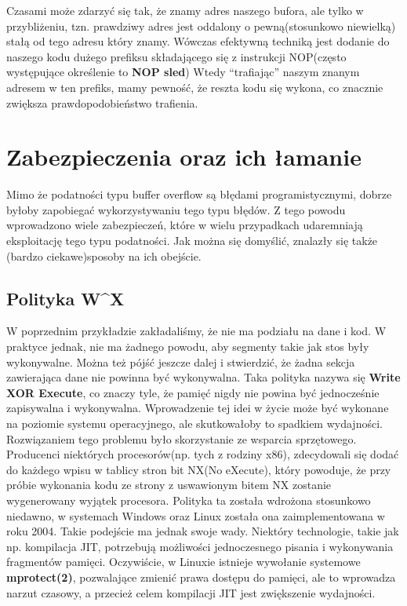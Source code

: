 \documentclass[polish]{kbk}
\begin{document}
Czasami może zdarzyć się tak, że znamy adres naszego bufora, ale tylko w przybliżeniu, tzn. 
prawdziwy adres jest oddalony o pewną(stosunkowo niewielką) stałą od tego adresu który znamy.
Wówczas efektywną techniką jest dodanie do naszego kodu dużego prefiksu składającego się z instrukcji NOP(często występujące określenie to \textbf{NOP sled}) Wtedy ``trafiając'' naszym znanym adresem w ten prefiks, mamy pewność, że reszta kodu się wykona, co znacznie zwiększa prawdopodobieństwo trafienia. 


\section{Zabezpieczenia oraz ich łamanie}
Mimo że podatności typu buffer overflow są błędami programistycznymi, dobrze byłoby zapobiegać 
wykorzystywaniu tego typu błędów.
Z tego powodu wprowadzono wiele zabezpieczeń, które w wielu przypadkach udaremniają eksploitację 
tego typu podatności. Jak można się domyślić, znalazły się także (bardzo ciekawe)sposoby na ich obejście.
\subsection{Polityka W\string^X}
W poprzednim przykładzie zakładaliśmy, że nie ma podziału na dane i kod. 
W praktyce jednak, nie ma żadnego powodu, aby segmenty takie jak stos były wykonywalne.
Można też pójść jeszcze dalej i stwierdzić, że żadna sekcja zawierająca dane nie powinna być wykonywalna. Taka polityka nazywa się \textbf{Write XOR Execute}, co znaczy tyle, że pamięć nigdy nie powina być jednocześnie zapisywalna i wykonywalna. Wprowadzenie tej idei w życie może być
wykonane na poziomie systemu operacyjnego, ale skutkowałoby to spadkiem wydajności\cite{bitnx}. Rozwiązaniem tego problemu było skorzystanie ze wsparcia sprzętowego. Producenci niektórych procesorów(np. tych z rodziny x86), zdecydowali się dodać do każdego wpisu w tablicy stron bit NX(No eXecute), który powoduje, że przy próbie wykonania kodu ze strony z uswawionym bitem NX zostanie wygenerowany wyjątek procesora.
Polityka ta została wdrożona stosunkowo niedawno, w systemach Windows oraz Linux została ona zaimplementowana w roku 2004\cite{bitnx}.\newline
Takie podejście ma jednak swoje wady. Niektóry technologie, takie jak np. kompilacja JIT, potrzebują możliwości jednoczesnego pisania i wykonywania fragmentów pamięci. Oczywiście, w Linuxie istnieje wywołanie systemowe \textbf{mprotect(2)}, pozwalające zmienić prawa dostępu do pamięci, ale to wprowadza narzut czasowy, a przecież celem kompilacji JIT jest zwiększenie wydajności.
\end{document}
